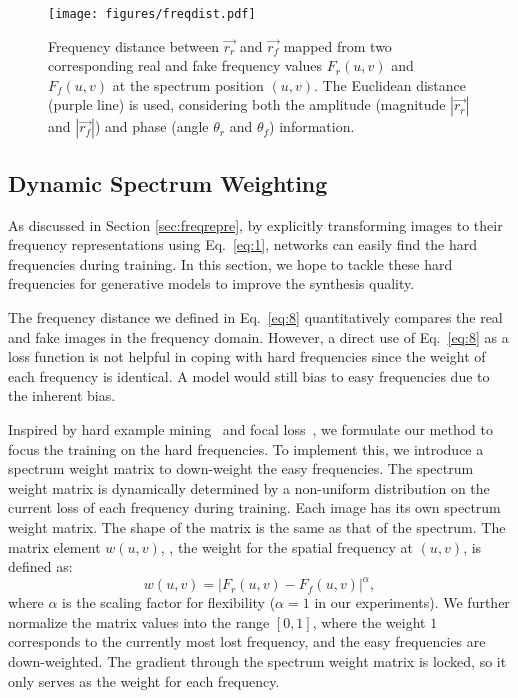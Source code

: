 \documentclass[10pt,twocolumn,letterpaper]{article}
\begin{document}
\begin{figure}[t]
	\centering
\texttt{[image: figures/freqdist.pdf]}
\caption{Frequency distance between $\vec{r_r}$ and $\vec{r_f}$ mapped from two corresponding real and fake frequency values $F_r\left(u,v\right)$ and $F_f\left(u,v\right)$ at the spectrum position $\left(u,v\right)$. The Euclidean distance (purple line) is used, considering both the amplitude (magnitude $|\vec{r_r}|$ and $|\vec{r_f}|$) and phase (angle $\theta_r$ and $\theta_f$) information.}
	\label{fig:freqdist}
	\vspace{-0.2cm}
\end{figure}


\subsection{Dynamic Spectrum Weighting}
\label{sec:weightmatrix}



As discussed in Section \ref{sec:freqrepre}, by explicitly transforming images to their frequency representations using Eq.~\eqref{eq:1}, networks can easily find the hard frequencies during training.
In this section, we hope to tackle these hard frequencies for generative models to improve the synthesis quality.
\fi

The frequency distance we defined in Eq.~\eqref{eq:8} quantitatively compares the real and fake images in the frequency domain.
However, a direct use of Eq.~\eqref{eq:8} as a loss function is not helpful in coping with hard frequencies since the weight of each frequency is identical. A model would still bias to easy frequencies due to the inherent bias. 

Inspired by hard example mining~\cite{hempartmodel,ohem} and focal loss~\cite{focalloss}, we formulate our method to focus the training on the hard frequencies. To implement this, we introduce a spectrum weight matrix to down-weight the easy frequencies.
The spectrum weight matrix is dynamically determined by a non-uniform distribution on the current loss of each frequency during training.
Each image has its own spectrum weight matrix.
The shape of the matrix is the same as that of the spectrum.
The matrix element $w\left(u,v\right)$, \ie, the weight for the spatial frequency at $\left(u,v\right)$, is defined as:
\begin{equation}
\label{eq:9}
    w\left(u,v\right)=|F_r\left(u,v\right)-F_f\left(u,v\right)|^\alpha,
\end{equation}
where $\alpha$ is the scaling factor for flexibility ($\alpha=1$ in our experiments). We further normalize the matrix values into the range $[0, 1]$, where the weight $1$ corresponds to the currently most lost frequency, and the easy frequencies are down-weighted. The gradient through the spectrum weight matrix is locked, so it only serves as the weight for each frequency.
\end{document}
